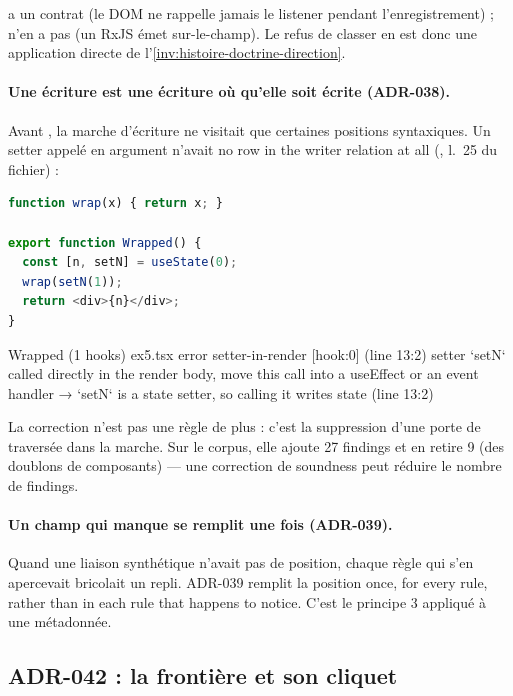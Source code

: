 
 a un contrat (le DOM ne rappelle jamais le listener pendant l'enregistrement) ;  n'en a pas (un  RxJS émet sur-le-champ). Le refus de classer  en  est donc une application directe de l'\cref{inv:histoire-doctrine-direction}.

\paragraph{Une écriture est une écriture où qu'elle soit écrite (ADR-038).} Avant , la marche d'écriture ne visitait que certaines positions syntaxiques. Un setter appelé en argument n'avait \og no row in the writer relation at all\fg{} (, l.~25 du fichier) :

\begin{lstlisting}[language=TypeScript,caption={\file{/tmp/ch26/ex5.tsx}, composant \code{Wrapped} (extrait)}]
function wrap(x) { return x; }

export function Wrapped() {
  const [n, setN] = useState(0);
  wrap(setN(1));
  return <div>{n}</div>;
}
\end{lstlisting}
\begin{sortie}
  Wrapped  (1 hooks)  ex5.tsx
    error  setter-in-render  [hook:0]  (line 13:2)  setter `setN` called directly in the render body, move this call into a useEffect or an event handler
       → `setN` is a state setter, so calling it writes state (line 13:2)
\end{sortie}
La correction n'est pas une règle de plus : c'est la suppression d'une porte de traversée dans la marche. Sur le corpus, elle ajoute 27 findings et en retire 9 (des doublons de composants) --- une correction de soundness peut réduire le nombre de findings.

\paragraph{Un champ qui manque se remplit une fois (ADR-039).} Quand une liaison synthétique n'avait pas de position, chaque règle qui s'en apercevait bricolait un repli. ADR-039 remplit la position \og once, for every rule, rather than in each rule that happens to notice\fg{}. C'est le principe 3 appliqué à une métadonnée.

\subsection{ADR-042 : la frontière et son cliquet}

